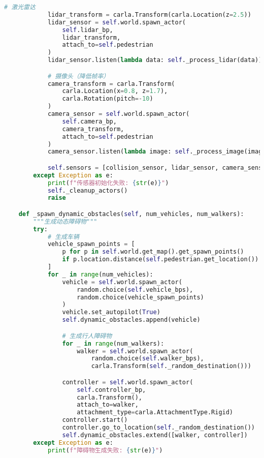 \begin{lstlisting}[language=Python]
            # 激光雷达
            lidar_transform = carla.Transform(carla.Location(z=2.5))
            lidar_sensor = self.world.spawn_actor(
                self.lidar_bp,
                lidar_transform,
                attach_to=self.pedestrian
            )
            lidar_sensor.listen(lambda data: self._process_lidar(data))

            # 摄像头（降低帧率）
            camera_transform = carla.Transform(
                carla.Location(x=0.8, z=1.7),
                carla.Rotation(pitch=-10)
            )
            camera_sensor = self.world.spawn_actor(
                self.camera_bp,
                camera_transform,
                attach_to=self.pedestrian
            )
            camera_sensor.listen(lambda image: self._process_image(image))

            self.sensors = [collision_sensor, lidar_sensor, camera_sensor]
        except Exception as e:
            print(f"传感器初始化失败: {str(e)}")
            self._cleanup_actors()
            raise

    def _spawn_dynamic_obstacles(self, num_vehicles, num_walkers):
        """生成动态障碍物"""
        try:
            # 生成车辆
            vehicle_spawn_points = [
                p for p in self.world.get_map().get_spawn_points()
                if p.location.distance(self.pedestrian.get_location()) > 20.0
            ]
            for _ in range(num_vehicles):
                vehicle = self.world.spawn_actor(
                    random.choice(self.vehicle_bps),
                    random.choice(vehicle_spawn_points)
                )
                vehicle.set_autopilot(True)
                self.dynamic_obstacles.append(vehicle)

                # 生成行人障碍物
                for _ in range(num_walkers):
                    walker = self.world.spawn_actor(
                        random.choice(self.walker_bps),
                        carla.Transform(self._random_destination()))

                controller = self.world.spawn_actor(
                    self.controller_bp,
                    carla.Transform(),
                    attach_to=walker,
                    attachment_type=carla.AttachmentType.Rigid)
                controller.start()
                controller.go_to_location(self._random_destination())
                self.dynamic_obstacles.extend([walker, controller])
        except Exception as e:
            print(f"障碍物生成失败: {str(e)}")


\end{lstlisting}
